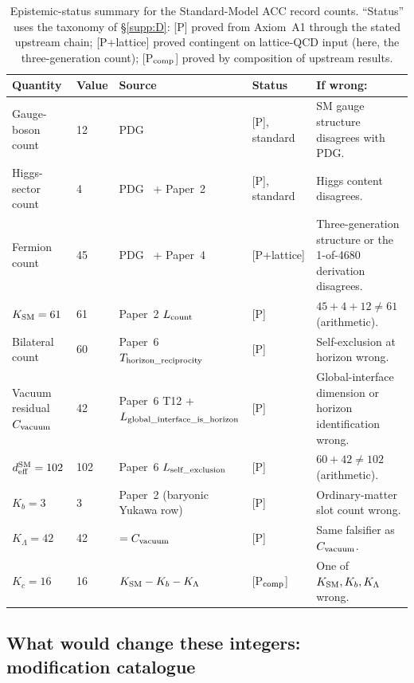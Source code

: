 \documentclass[11pt]{article}
\theoremstyle{plain}
\theoremstyle{definition}
\theoremstyle{remark}
\begin{document}
\begin{table}[h]
\centering
\small
\setlength{\tabcolsep}{4pt}
\begin{tabularx}{\textwidth}{@{}l l l l X@{}}
\toprule
\textbf{Quantity} & \textbf{Value} & \textbf{Source} & \textbf{Status} & \textbf{If wrong:} \\
\midrule
Gauge-boson count           & 12          & PDG~\cite{PDG2024} & [P], standard & SM gauge structure disagrees with PDG. \\
Higgs-sector count          & 4           & PDG~\cite{PDG2024} + Paper~2 & [P], standard & Higgs content disagrees. \\
Fermion count               & 45          & PDG~\cite{PDG2024} + Paper~4 & [P+lattice] & Three-generation structure or the 1-of-4680 derivation disagrees. \\
$K_{\rm SM} = 61$              & 61          & Paper~2 $L_{\rm count}$ & [P] & $45 + 4 + 12 \neq 61$ (arithmetic). \\
Bilateral count             & 60          & Paper~6 $T_{\rm horizon\_reciprocity}$ & [P] & Self-exclusion at horizon wrong. \\
Vacuum residual $C_{\rm vacuum}$ & 42       & Paper~6 T12 + $L_{\rm global\_interface\_is\_horizon}$ & [P] & Global-interface dimension or horizon identification wrong. \\
$d_{\rm eff}^{\rm SM} = 102$     & 102         & Paper~6 $L_{\rm self\_exclusion}$ & [P] & $60 + 42 \neq 102$ (arithmetic). \\
$K_b = 3$                   & 3           & Paper~2 (baryonic Yukawa row) & [P] & Ordinary-matter slot count wrong. \\
$K_\Lambda = 42$            & 42          & $= C_{\rm vacuum}$ & [P] & Same falsifier as $C_{\rm vacuum}$. \\
$K_c = 16$                  & 16          & $K_{\rm SM} - K_b - K_\Lambda$ & [P$_{\rm comp}$] & One of $K_{\rm SM}, K_b, K_\Lambda$ wrong. \\
\bottomrule
\end{tabularx}
\caption{Epistemic-status summary for the Standard-Model ACC record counts.  ``Status'' uses the taxonomy of \S\ref{supp:D}: [P] proved from Axiom~A1 through the stated upstream chain; [P+lattice] proved contingent on lattice-QCD input (here, the three-generation count); [P$_{\rm comp}$] proved by composition of upstream results.}\label{tab:M_epistemic}
\end{table}

\subsection{What would change these integers: modification catalogue}\label{supp:M7}
\end{document}
